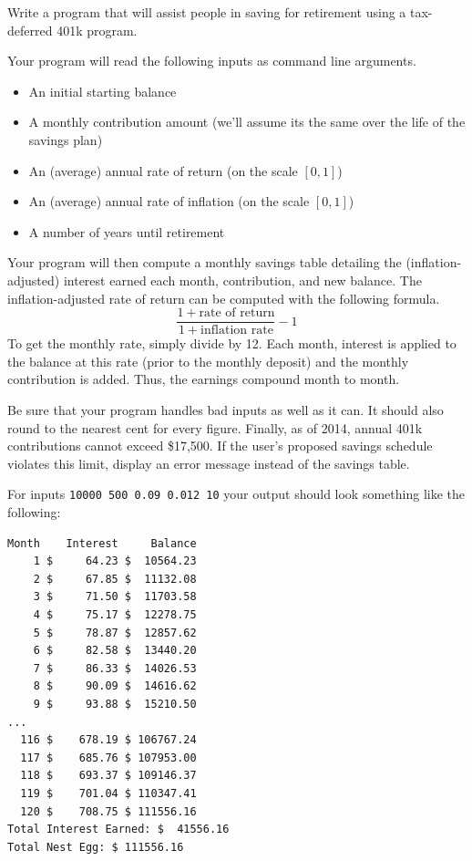 \begin{exer}
Write a program that will assist people in saving for retirement
using a tax-deferred 401k program.  

Your program will read the following inputs as command line arguments.
\begin{itemize}
  \item An initial starting balance
  \item A monthly contribution amount (we'll assume its the same over the life of the savings plan)
  \item An (average) annual rate of return (on the scale $[0, 1]$)
  \item An (average) annual rate of inflation (on the scale $[0, 1]$)
  \item A number of years until retirement
\end{itemize}
Your program will then compute a monthly savings table detailing
the (inflation-adjusted) interest earned each month, contribution, and
new balance.  The inflation-adjusted rate of return can be computed 
with the following formula.
  $$\frac{1 + \textrm{rate of return}}{1+\textrm{inflation rate}} - 1$$
To get the monthly rate, simply divide by 12.  Each month, interest 
is applied to the balance at this rate (prior to the monthly deposit) and
the monthly contribution is added.  Thus, the earnings compound 
month to month.

Be sure that your program handles bad inputs as well as it can.  It
should also round to the nearest cent for every figure.  Finally, 
as of 2014, annual 401k contributions cannot exceed \$17,500.  
If the user's proposed savings schedule violates this limit, display 
an error message instead of the savings table.

For inputs \texttt{10000 500 0.09 0.012 10} your output
should look something like the following:

\begin{verbatim}
Month    Interest     Balance 
    1 $     64.23 $  10564.23
    2 $     67.85 $  11132.08
    3 $     71.50 $  11703.58
    4 $     75.17 $  12278.75
    5 $     78.87 $  12857.62
    6 $     82.58 $  13440.20
    7 $     86.33 $  14026.53
    8 $     90.09 $  14616.62
    9 $     93.88 $  15210.50
...    
  116 $    678.19 $ 106767.24
  117 $    685.76 $ 107953.00
  118 $    693.37 $ 109146.37
  119 $    701.04 $ 110347.41
  120 $    708.75 $ 111556.16
Total Interest Earned: $  41556.16
Total Nest Egg: $ 111556.16
\end{verbatim}
\end{exer}

